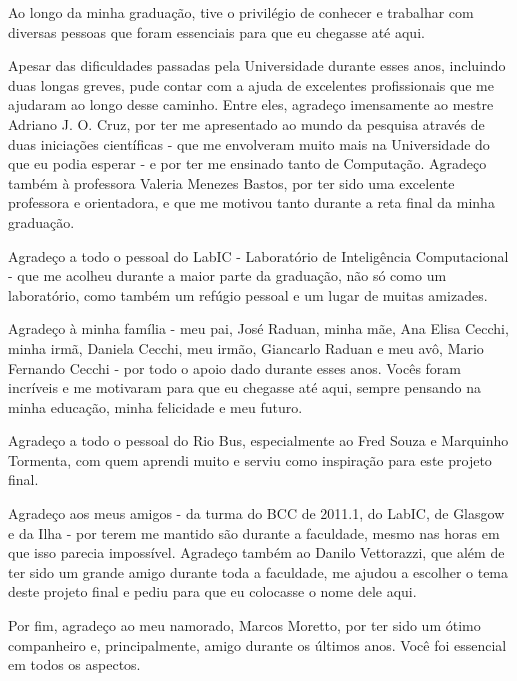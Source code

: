 Ao longo da minha graduação, tive o privilégio de conhecer e trabalhar com diversas pessoas que foram essenciais para que eu chegasse até aqui.

Apesar das dificuldades passadas pela Universidade durante esses anos, incluindo duas longas greves, pude contar com a ajuda de excelentes profissionais que me ajudaram ao longo desse caminho. Entre eles, agradeço imensamente ao mestre Adriano J. O. Cruz, por ter me apresentado ao mundo da pesquisa através de duas iniciações científicas - que me envolveram muito mais na Universidade do que eu podia esperar - e por ter me ensinado tanto de Computação. Agradeço também à professora Valeria Menezes Bastos, por ter sido uma excelente professora e orientadora, e que me motivou tanto durante a reta final da minha graduação.

Agradeço a todo o pessoal do LabIC - Laboratório de Inteligência Computacional - que me acolheu durante a maior parte da graduação, não só como um laboratório, como também um refúgio pessoal e um lugar de muitas amizades.

Agradeço à minha família - meu pai, José Raduan, minha mãe, Ana Elisa Cecchi, minha irmã, Daniela Cecchi, meu irmão, Giancarlo Raduan e meu avô, Mario Fernando Cecchi - por todo o apoio dado durante esses anos. Vocês foram incríveis e me motivaram para que eu chegasse até aqui, sempre pensando na minha educação, minha felicidade e meu futuro.

Agradeço a todo o pessoal do Rio Bus, especialmente ao Fred Souza e Marquinho Tormenta, com quem aprendi muito e serviu como inspiração para este projeto final.

Agradeço aos meus amigos - da turma do BCC de 2011.1, do LabIC, de Glasgow e da Ilha - por terem me mantido são durante a faculdade, mesmo nas horas em que isso parecia impossível. Agradeço também ao Danilo Vettorazzi, que além de ter sido um grande amigo durante toda a faculdade, me ajudou a escolher o tema deste projeto final e pediu para que eu colocasse o nome dele aqui.

Por fim, agradeço ao meu namorado, Marcos Moretto, por ter sido um ótimo companheiro e, principalmente, amigo durante os últimos anos. Você foi essencial em todos os aspectos.
